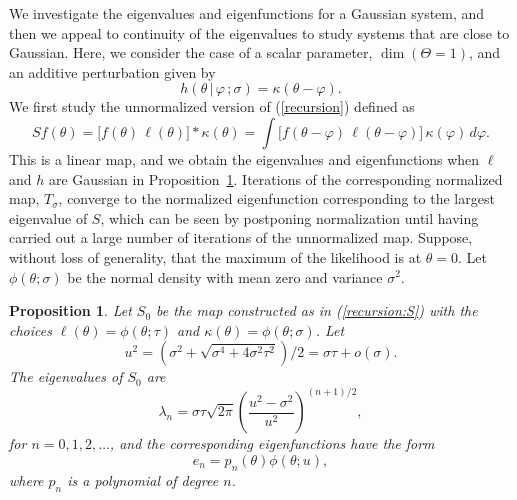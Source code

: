 \documentclass[11pt]{article}
\newcommand{\bbTheta}{\Theta}
\newcommand\mytheta{\theta}
\newcommand\lik{\ell}
\newcommand\Thetaspace{{\bbTheta}}
\newcommand\given{{\, | \,}}
\newcommand\giventh{\,;}
\newtheorem{prop}{Proposition}
\begin{document}
We investigate the eigenvalues and eigenfunctions for a Gaussian system, and then we appeal to continuity of the eigenvalues to study systems that are close to Gaussian.
Here, we consider the case of a scalar parameter, $\dim(\Thetaspace=1)$, and an additive perturbation given by
\begin{equation}\label{eq:kappa}
h(\theta\given\varphi\giventh\sigma)= \kappa(\theta-\varphi).
\end{equation}
We first study the unnormalized version of (\ref{recursion}) defined as
\begin{equation}
\label{recursion:S}
Sf(\mytheta) = \big[ f(\mytheta)\, \lik(\mytheta) \big] * \kappa(\mytheta)
= \int\big[ f(\mytheta-\varphi)\, \lik(\mytheta-\varphi) \big] \, \kappa(\varphi)\, d\varphi.
\end{equation}
This is a linear map, and we obtain the eigenvalues and eigenfunctions when $\lik$ and $h$ are Gaussian in Proposition~\ref{prop:eigen}.
Iterations of the corresponding normalized map, $T_\sigma$, converge to the normalized eigenfunction corresponding to the largest eigenvalue of $S$, which can be seen by postponing normalization until having carried out a large number of iterations of the unnormalized map.
Suppose, without loss of generality, that the maximum of the likelihood is at $\theta=0$. 
Let $\phi(\mytheta;\sigma)$ be the normal density with mean zero and variance $\sigma^2$.
\begin{prop}\label{prop:eigen}
Let $S_0$ be the map constructed as in (\ref{recursion:S}) with the choices
$\lik(\mytheta)=\phi(\mytheta;\tau)$ and $\kappa(\mytheta)=\phi(\mytheta;\sigma)$. Let 
\begin{equation}
u^2 = \left(\sigma^2+\sqrt{\sigma^4+4\sigma^2\tau^2}\right)/2 = \sigma\tau + o(\sigma).
\end{equation}
The eigenvalues of $S_0$ are 
$$
\lambda_n = \sigma\tau \sqrt{2\pi}\left( \frac{u^2-\sigma^2}{u^2}\right)^{(n+1)/2},
$$
for $n=0,1,2,\dots$, and the corresponding eigenfunctions have the form
\begin{equation}
\label{eq:eigenFuncs}
e_n = p_n(\mytheta)\phi(\mytheta;u),
\end{equation}
where $p_n$ is a polynomial of degree $n$.
\end{prop}
\end{document}

